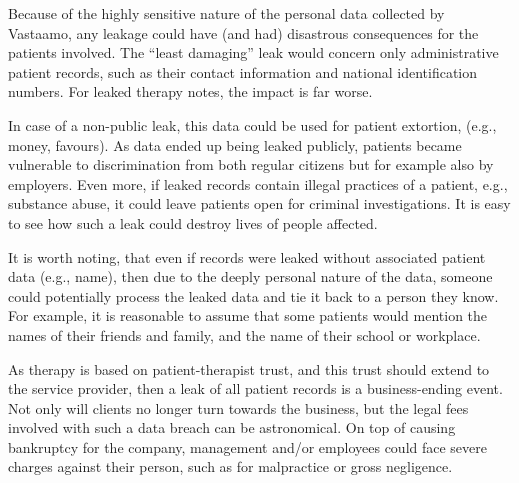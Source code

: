 \documentclass[parskip=half]{scrartcl}
\begin{document}
Because of the highly sensitive nature of the personal data collected by
Vastaamo, any leakage could have (and had) disastrous consequences for
the patients involved. The ``least damaging'' leak would concern only
administrative patient records, such as their contact information and national
identification numbers. For leaked therapy notes, the impact is far worse.

In case of a non-public leak, this data could be used for patient extortion,
(e.g., money, favours). As data ended up being leaked publicly, patients became
vulnerable to discrimination from both regular citizens but for example also by
employers. Even more, if leaked records contain illegal practices of a patient,
e.g., substance abuse, it could leave patients open for criminal investigations.
It is easy to see how such a leak could destroy lives of people affected.

It is worth noting, that even if records were leaked without associated patient
data (e.g., name), then due to the deeply personal nature of the data, someone
could potentially process the leaked data and tie it back to a person they know.
For example, it is reasonable to assume that some patients would mention the
names of their friends and family, and the name of their school or workplace.

As therapy is based on patient-therapist trust, and this trust should extend to
the service provider, then a leak of all patient records is a business-ending
event. Not only will clients no longer turn towards the business, but the legal
fees involved with such a data breach can be astronomical. On top of causing
bankruptcy for the company, management and/or employees could face severe
charges against their person, such as for malpractice or gross negligence.


\printbibliography
\end{document}
